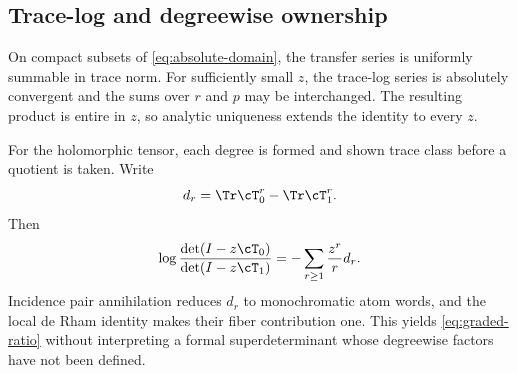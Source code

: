 \subsection{Trace-log and degreewise ownership}

On compact subsets of \eqref{eq:absolute-domain}, the transfer series is
uniformly summable in trace norm. For sufficiently small \(z\), the
trace-log series is absolutely convergent and the sums over \(r\) and \(p\)
may be interchanged. The resulting product is entire in \(z\), so analytic
uniqueness extends the identity to every \(z\).

For the holomorphic tensor, each degree is formed and shown trace class before
a quotient is taken. Write
\[
d_r=\Tr\cT_0^r-\Tr\cT_1^r.
\]
Then
\[
\log\frac{\det(I-z\cT_0)}{\det(I-z\cT_1)}
=-\sum_{r\ge1}\frac{z^r}{r}d_r.
\]
Incidence pair annihilation reduces \(d_r\) to monochromatic atom words, and
the local de Rham identity makes their fiber contribution one. This yields
\eqref{eq:graded-ratio} without interpreting a formal superdeterminant whose
degreewise factors have not been defined.
